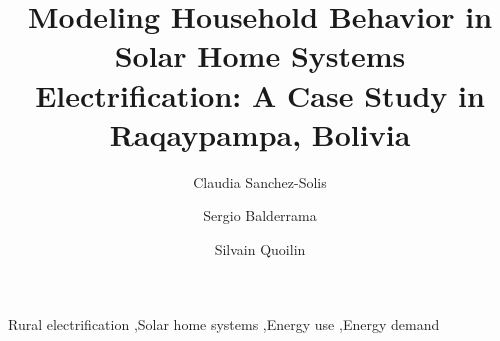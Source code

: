 \documentclass[final,3p,times,onecolumn]{elsarticle}
\begin{document}
\begin{frontmatter}



\title{Modeling Household Behavior in Solar Home Systems Electrification: A Case Study in Raqaypampa, Bolivia}


\author[inst1,inst2]{Claudia Sanchez-Solis}



\author[inst1]{Sergio Balderrama}

\author[inst2]{Silvain Quoilin}


\begin{keyword}
Rural electrification \sep Solar home systems \sep Energy use \sep Energy demand

\end{keyword}

\end{frontmatter}
\end{document}
